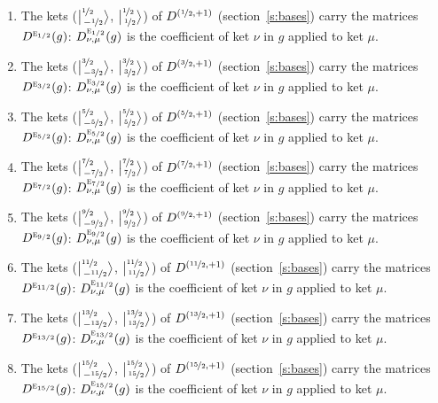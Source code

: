 \documentclass[10pt,a4paper]{article}
\numberwithin{equation}{section}
\newcommand{\irr}[1]{\text{\normalfont\scshape #1}}
\newcommand{\irrJp}[2]{D^{(#1,#2)}}
\newcommand{\repD}[1]{D^{#1}}
\newcommand{\intx}{\mu}
\newcommand{\jm}[2]{\bigl\lvert{}^{#1}_{\,#2}\bigr\rangle}
\newenvironment{romanlist}{\begin{enumerate}%
\renewcommand{\labelenumi}{(\roman{enumi})}}%
  {\end{enumerate}}
\begin{document}
\begin{romanlist}\raggedright
\item The kets ($\jm{\nicefrac{1}{2}}{-\nicefrac{1}{2}}$, $\jm{\nicefrac{1}{2}}{\nicefrac{1}{2}}$) of $\irrJp{\nicefrac{1}{2}}{+1}$ (section~\ref{s:bases}) carry the matrices $\repD{\irr{e}_{1/2}}(g)$: $\repD{\irr{e}_{1/2}}_{\nu,\intx}(g)$ is the coefficient of ket $\nu$ in $g$ applied to ket $\intx$.
\item The kets ($\jm{\nicefrac{3}{2}}{-\nicefrac{3}{2}}$, $\jm{\nicefrac{3}{2}}{\nicefrac{3}{2}}$) of $\irrJp{\nicefrac{3}{2}}{+1}$ (section~\ref{s:bases}) carry the matrices $\repD{\irr{e}_{3/2}}(g)$: $\repD{\irr{e}_{3/2}}_{\nu,\intx}(g)$ is the coefficient of ket $\nu$ in $g$ applied to ket $\intx$.
\item The kets ($\jm{\nicefrac{5}{2}}{-\nicefrac{5}{2}}$, $\jm{\nicefrac{5}{2}}{\nicefrac{5}{2}}$) of $\irrJp{\nicefrac{5}{2}}{+1}$ (section~\ref{s:bases}) carry the matrices $\repD{\irr{e}_{5/2}}(g)$: $\repD{\irr{e}_{5/2}}_{\nu,\intx}(g)$ is the coefficient of ket $\nu$ in $g$ applied to ket $\intx$.
\item The kets ($\jm{\nicefrac{7}{2}}{-\nicefrac{7}{2}}$, $\jm{\nicefrac{7}{2}}{\nicefrac{7}{2}}$) of $\irrJp{\nicefrac{7}{2}}{+1}$ (section~\ref{s:bases}) carry the matrices $\repD{\irr{e}_{7/2}}(g)$: $\repD{\irr{e}_{7/2}}_{\nu,\intx}(g)$ is the coefficient of ket $\nu$ in $g$ applied to ket $\intx$.
\item The kets ($\jm{\nicefrac{9}{2}}{-\nicefrac{9}{2}}$, $\jm{\nicefrac{9}{2}}{\nicefrac{9}{2}}$) of $\irrJp{\nicefrac{9}{2}}{+1}$ (section~\ref{s:bases}) carry the matrices $\repD{\irr{e}_{9/2}}(g)$: $\repD{\irr{e}_{9/2}}_{\nu,\intx}(g)$ is the coefficient of ket $\nu$ in $g$ applied to ket $\intx$.
\item The kets ($\jm{\nicefrac{11}{2}}{-\nicefrac{11}{2}}$, $\jm{\nicefrac{11}{2}}{\nicefrac{11}{2}}$) of $\irrJp{\nicefrac{11}{2}}{+1}$ (section~\ref{s:bases}) carry the matrices $\repD{\irr{e}_{11/2}}(g)$: $\repD{\irr{e}_{11/2}}_{\nu,\intx}(g)$ is the coefficient of ket $\nu$ in $g$ applied to ket $\intx$.
\item The kets ($\jm{\nicefrac{13}{2}}{-\nicefrac{13}{2}}$, $\jm{\nicefrac{13}{2}}{\nicefrac{13}{2}}$) of $\irrJp{\nicefrac{13}{2}}{+1}$ (section~\ref{s:bases}) carry the matrices $\repD{\irr{e}_{13/2}}(g)$: $\repD{\irr{e}_{13/2}}_{\nu,\intx}(g)$ is the coefficient of ket $\nu$ in $g$ applied to ket $\intx$.
\item The kets ($\jm{\nicefrac{15}{2}}{-\nicefrac{15}{2}}$, $\jm{\nicefrac{15}{2}}{\nicefrac{15}{2}}$) of $\irrJp{\nicefrac{15}{2}}{+1}$ (section~\ref{s:bases}) carry the matrices $\repD{\irr{e}_{15/2}}(g)$: $\repD{\irr{e}_{15/2}}_{\nu,\intx}(g)$ is the coefficient of ket $\nu$ in $g$ applied to ket $\intx$.

\end{romanlist}
\end{document}
